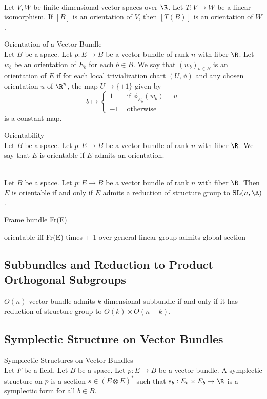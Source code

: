 \documentclass[a4paper]{article}
\begin{document}
\begin{prp}{}{}\\
Let $V,W$ be finite dimensional vector spaces over $\R$. Let $T:V\to W$ be a linear isomorphism. If $[B]$ is an orientation of $V$, then $[T(B)]$ is an orientation of $W$. 
\end{prp}

\begin{defn}{Orientation of a Vector Bundle}{}\\
Let $B$ be a space. Let $p:E\to B$ be a vector bundle of rank $n$ with fiber $\R$. Let $w_b$ be an orientation of $E_b$ for each $b\in B$. We say that $(w_b)_{b\in B}$ is an orientation of $E$ if for each local trivialization chart $(U,\phi)$ and any chosen orientation $u$ of $\R^n$, the map $U\to\{\pm1\}$ given by $$b\mapsto\begin{cases}
1 & \text{ if }\phi_{E_b}(w_b)=u\\
-1 & \text{ otherwise }
\end{cases}$$
is a constant map. 
\end{defn}

\begin{defn}{Orientability}{}\\
Let $B$ be a space. Let $p:E\to B$ be a vector bundle of rank $n$ with fiber $\R$. We say that $E$ is orientable if $E$ admits an orientation. 
\end{defn}

\begin{prp}{}{}\\
Let $B$ be a space. Let $p:E\to B$ be a vector bundle of rank $n$ with fiber $\R$. Then $E$ is orientable if and only if $E$ admits a reduction of structure group to $\text{SL}(n,\R)$. 
\end{prp}

Frame bundle Fr(E)

orientable iff Fr(E) times +-1 over general linear group admits global section

\subsection{Subbundles and Reduction to Product Orthogonal Subgroups}
$O(n)$-vector bundle admits $k$-dimensional subbundle if and only if it has reduction of structure group to $O(k)\times O(n-k)$. 

\subsection{Symplectic Structure on Vector Bundles}
\begin{defn}{Symplectic Structures on Vector Bundles}{}\\
Let $F$ be a field. Let $B$ be a space. Let $p:E\to B$ be a vector bundle. A symplectic structure on $p$ is a section $s\in(E\otimes E)^\ast$ such that $s_b:E_b\times E_b\to\R$ is a symplectic form for all $b\in B$. 
\end{defn}
\end{document}
